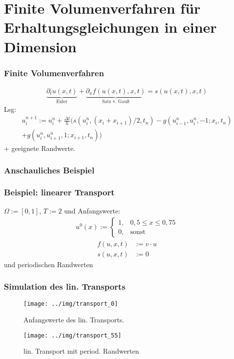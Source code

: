 \section{Finite Volumenverfahren für Erhaltungsgleichungen in einer Dimension}
\begin{frame}
\frametitle{Finite Volumenverfahren}
\begin{align}
\underbrace{\partial _t u(x,t)}_{\text{Euler}} + \underbrace{\partial _xf(u(x,t),x,t)}_{\text{Satz v. Gauß}} = s(u(x,t),x,t)
\end{align}
Lsg:
\begin{align}
u_i^{n+1}:=u_i^n+\frac{\Delta t}{h} (s(u_i^n,(x_i+x_{i+1})/2,t_n)-g(u_{i-1}^n,u_i^n,-1;x_i,t_n)\nonumber \\
+g(u_i^n,u_{i+1}^n,1;x_{i+1},t_n))
\end{align}
+ geeignete Randwerte.
\end{frame}
\begin{frame}
\frametitle{Anschauliches Beispiel}
\begin{figure}

\end{figure}
\end{frame}
\begin{frame}
\frametitle{Beispiel: linearer Transport}
$\Omega:=\left[0, 1\right]$, $T:=2$ und Anfangswerte:
\begin{align}
u^0(x):=\left\{\begin{array}{ll} 1, & 0{,}5\leq x \leq 0{,}75 \\
0, & \text{sonst}\end{array}\right.
\end{align}
\begin{align}
f(u,x,t)&:=v\cdot u\\
s(u,x,t)&:=0
\end{align}
und periodischen Randwerten
\end{frame}
\begin{frame}
\frametitle{Simulation des lin. Transports}
\begin{minipage}[t]{0.48\linewidth}
\begin{figure}
\centering
\texttt{[image: ../img/transport\_0]}
\caption{Anfangswerte des lin. Transports.}
\label{fig:transport_0}
\end{figure}
\end{minipage}
\begin{minipage}[t]{0.5\linewidth}
\begin{figure}
\centering
\texttt{[image: ../img/transport\_55]}
\caption{lin. Transport mit period. Randwerten}
\label{fig:transport_55}
\end{figure}

\end{minipage}
\end{frame}
